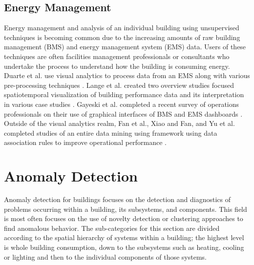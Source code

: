 \subsection{Energy Management}
Energy management and analysis of an individual building using unsupervised techniques is becoming common due to the increasing amounts of raw building management (BMS) and energy management system (EMS) data. Users of these techniques are often facilities management professionals or consultants who undertake the process to understand how the building is consuming energy. Duarte et al. use visual analytics to process data from an EMS along with various pre-processing techniques \citep{duarte_prioritizing_2011}. Lange et al. created two overview studies focused spatiotemporal visualization of building performance data and its interpretation in various case studies \citep{lange_energy_2012,lange_discovering_2013}. Gayeski et al. completed a recent survey of operations professionals on their use of graphical interfaces of BMS and EMS dashboards \citep{gayeski_data_2015}. Outside of the visual analytics realm, Fan et al., Xiao and Fan, and Yu et al. completed studies of an entire data mining using framework using data association rules to improve operational performance \citep{fan_temporal_2015,xiao_data_2014,yu_extracting_2013}.

\section{Anomaly Detection}
\label{AnomalyDetection}
Anomaly detection for buildings focuses on the detection and diagnostics of problems occurring within a building, its subsystems, and components. This field is most often focuses on the use of novelty detection or clustering approaches to find anomalous behavior. The sub-categories for this section are divided according to the spatial hierarchy of systems within a building; the highest level is whole building consumption, down to the subsystems such as heating, cooling or lighting and then to the individual components of those systems. 

